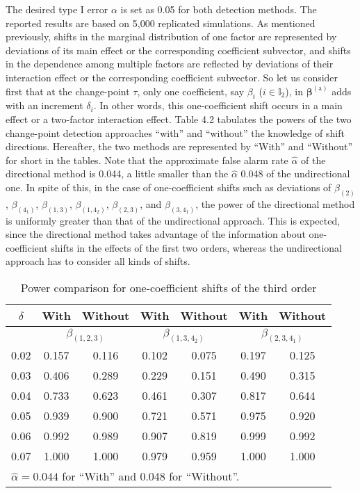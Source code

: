 The desired type I error $\alpha$ is set as 0.05 for both detection methods. The
reported results are based on 5,000 replicated simulations. As mentioned previously,
shifts in the marginal distribution of one factor are represented by deviations of
its main effect or the corresponding coefficient subvector, and shifts in the
dependence among multiple factors are reflected by deviations of their interaction
effect or the corresponding coefficient subvector. So let us consider first that at
the change-point $\tau$, only one coefficient, say $\beta_i$ ($i\in\mathbb{I}_2$),
in $\bm{\beta}^{(\mathrm{a})}$ adds with an increment $\delta_i$. In other words,
this one-coefficient shift occurs in a main effect or a two-factor interaction
effect. Table 4.2 tabulates the powers of the two change-point detection approaches
``with'' and ``without'' the knowledge of shift directions. Hereafter, the two
methods are represented by ``With'' and ``Without'' for short in the tables. Note
that the approximate false alarm rate $\hat{\alpha}$ of the directional method is
0.044, a little smaller than the $\hat{\alpha}$ 0.048 of the undirectional one. In
spite of this, in the case of one-coefficient shifts such as deviations of
$\beta_{(2)}$, $\beta_{(4_1)}$, $\beta_{(1,3)}$, $\beta_{(1,4_2)}$, $\beta_{(2,3)}$,
and $\beta_{(3,4_1)}$, the power of the directional method is uniformly greater than
that of the undirectional approach. This is expected, since the directional method
takes advantage of the information about one-coefficient shifts in the effects of
the first two orders, whereas the undirectional approach has to consider all kinds
of shifts.

\begin{table}[!ht]
\tabcolsep 7.5pt \vspace{-0.1cm} \centering \caption{Power comparison for
one-coefficient shifts of the third order} \vspace{0.3cm}
\renewcommand{\arraystretch}{1.25}
\begin{tabular}{c|cc|cc|cc}\hline
$\delta$ & With & Without & With & Without & With & Without
\\\hline
& \multicolumn{2}{c|}{$\beta_{(1,2,3)}$} & \multicolumn{2}{c|}{$\beta_{(1,3,4_2)}$}
& \multicolumn{2}{c}{$\beta_{(2,3,4_1)}$}
\\\hline
0.02 & 0.157 & 0.116 & 0.102 & 0.075 & 0.197 & 0.125 \\
0.03 & 0.406 & 0.289 & 0.229 & 0.151 & 0.490 & 0.315 \\
0.04 & 0.733 & 0.623 & 0.461 & 0.307 & 0.817 & 0.644 \\
0.05 & 0.939 & 0.900 & 0.721 & 0.571 & 0.975 & 0.920 \\
0.06 & 0.992 & 0.989 & 0.907 & 0.819 & 0.999 & 0.992 \\
0.07 & 1.000 & 1.000 & 0.979 & 0.959 & 1.000 & 1.000
\\\hline
\multicolumn{7}{l}{$\hat{\alpha}=0.044$ for ``With'' and 0.048 for ``Without''.}
\end{tabular}
\end{table}


